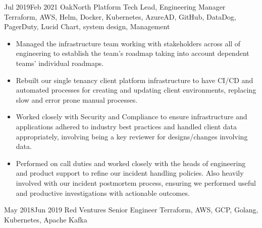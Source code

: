 \documentclass[10pt]{article} %
\begin{document}
\jobheader
{Jul 2019}{Feb 2021}
{OakNorth}
{Platform Tech Lead, Engineering Manager}
{
      Terraform,
      AWS,
      Helm,
      Docker,
      Kubernetes,
      AzureAD,
      GitHub,
      DataDog,
      PagerDuty,
      Lucid Chart,
      system design,
      Management
}
{
  \begin{itemize}
      \item Managed the infrastructure team working with stakeholders across all of engineering to establish the team's roadmap taking into account dependent teams' individual roadmaps.

      \item Rebuilt our single tenancy client platform infrastructure to have CI/CD and automated processes
            for creating and updating client environments, replacing slow and error prone manual processes.

      \item Worked closely with Security and Compliance to ensure infrastructure and applications adhered
            to industry best practices and handled client data appropriately, involving being a key
            reviewer for designs/changes involving data.


      \item Performed on call duties and worked closely with the heads of engineering and product support
            to refine our incident handling policies. Also heavily involved with our incident postmortem
            process, ensuring we performed useful and productive investigations with actionable outcomes.

  \end{itemize}
}
\jobheader
{May 2018}{Jun 2019}
{Red Ventures}
{Senior Engineer}
{
      Terraform,
      AWS,
      GCP,
      Golang,
      Kubernetes,
      Apache Kafka
}
\end{document}
